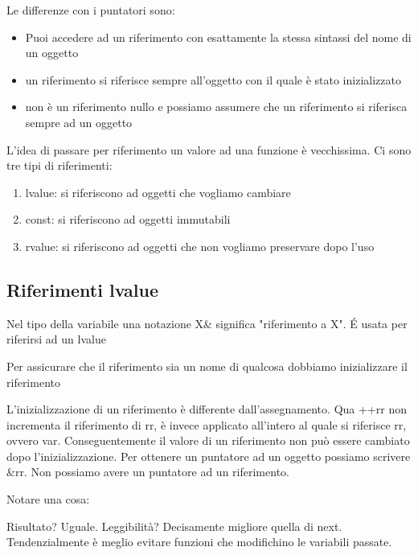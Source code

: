 \documentclass[11pt,a4paper]{book}
\begin{document}
Le differenze con i puntatori sono:
\begin{itemize}
	\item Puoi accedere ad un riferimento con esattamente la stessa sintassi del nome di un oggetto
	\item un riferimento si riferisce sempre all'oggetto con il quale è stato inizializzato
	\item non è un riferimento nullo e possiamo assumere che un riferimento si riferisca sempre ad un oggetto
\end{itemize}

\label{code: 096}

L'idea di passare per riferimento un valore ad una funzione è vecchissima. Ci sono tre tipi di riferimenti:
\begin{enumerate}
	\item lvalue: si riferiscono ad oggetti che vogliamo cambiare
	\item const: si riferiscono ad oggetti immutabili
	\item rvalue: si riferiscono ad oggetti che non vogliamo preservare dopo l'uso
\end{enumerate}

\subsection{Riferimenti lvalue}
Nel tipo della variabile una notazione X\& significa "riferimento a X". É usata per riferirsi ad un lvalue
\label{code: 097}

Per assicurare che il riferimento sia un nome di qualcosa dobbiamo inizializzare il riferimento
\label{code: 098}

L'inizializzazione di un riferimento è differente dall'assegnamento. 
\label{code: 099}
Qua ++rr non incrementa il riferimento di rr, è invece applicato all'intero al quale si riferisce rr, ovvero var. Conseguentemente il valore di un riferimento non può essere cambiato dopo l'inizializzazione. Per ottenere un puntatore ad un oggetto possiamo scrivere \&rr. Non possiamo avere un puntatore ad un riferimento.

Notare una cosa:
\label{code: 100}

Risultato? Uguale. Leggibilità? Decisamente migliore quella di next. Tendenzialmente è meglio evitare funzioni che modifichino le variabili passate.
\end{document}
